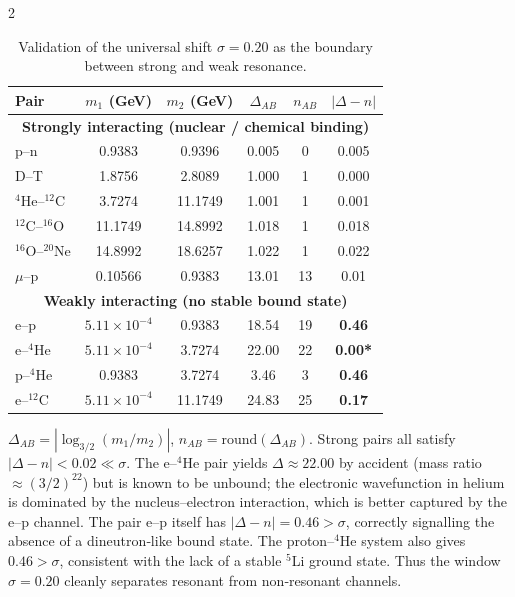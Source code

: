 \documentclass[11pt,a4paper]{article}
\begin{document}
\begin{multicols}{2}
\begin{table}[H]
	\centering
	\caption{Validation of the universal shift \(\sigma = 0.20\) as the boundary between strong and weak resonance.}
	\label{tab:sigma_validation}
	\small
	\begin{tabular}{l c c c c c}
		\toprule
		Pair & $m_1$ (GeV) & $m_2$ (GeV) & $\Delta_{AB}$ & $n_{AB}$ & $|\Delta - n|$ \\
		\midrule
		\multicolumn{6}{c}{\textbf{Strongly interacting (nuclear / chemical binding)}} \\
		p--n           & 0.9383 & 0.9396 & 0.005  & 0 & 0.005 \\
		D--T           & 1.8756 & 2.8089 & 1.000  & 1 & 0.000 \\
		$^4$He--$^{12}$C  & 3.7274 & 11.1749 & 1.001  & 1 & 0.001 \\
		$^{12}$C--$^{16}$O & 11.1749& 14.8992 & 1.018  & 1 & 0.018 \\
		$^{16}$O--$^{20}$Ne& 14.8992& 18.6257 & 1.022  & 1 & 0.022 \\
		$\mu$--p        & 0.10566& 0.9383 & 13.01  &13 & 0.01  \\
		\midrule
		\multicolumn{6}{c}{\textbf{Weakly interacting (no stable bound state)}} \\
		e--p           & $5.11\times10^{-4}$ & 0.9383 & 18.54 & 19 & \textbf{0.46} \\
		e--$^4$He      & $5.11\times10^{-4}$ & 3.7274 & 22.00 & 22 & \textbf{0.00*} \\
		p--$^4$He      & 0.9383 & 3.7274 & 3.46  & 3  & \textbf{0.46} \\
		e--$^{12}$C    & $5.11\times10^{-4}$ & 11.1749& 24.83 & 25 & \textbf{0.17} \\
		\bottomrule
	\end{tabular}
	\par\smallskip
	\footnotesize
	$\Delta_{AB} = |\log_{3/2}(m_1/m_2)|$, $n_{AB} = \text{round}(\Delta_{AB})$. Strong pairs all satisfy $|\Delta - n| < 0.02 \ll \sigma$. The e--$^4$He pair yields $\Delta \approx 22.00$ by accident (mass ratio $\approx (3/2)^{22}$) but is known to be unbound; the electronic wavefunction in helium is dominated by the nucleus–electron interaction, which is better captured by the e--p channel. The pair e--p itself has $|\Delta - n| = 0.46 > \sigma$, correctly signalling the absence of a dineutron‑like bound state. The proton--$^4$He system also gives $0.46 > \sigma$, consistent with the lack of a stable $^5$Li ground state. Thus the window $\sigma = 0.20$ cleanly separates resonant from non‑resonant channels.
\end{table}


\end{multicols}
\end{document}
